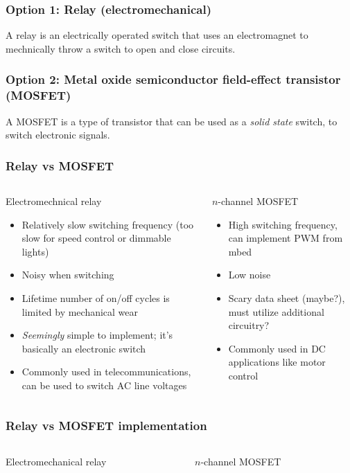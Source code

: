 \documentclass[aspectratio=169]{beamer}
\begin{document}
\begin{frame}
\frametitle{Option 1: Relay (electromechanical)}
A relay is an electrically operated switch that uses an electromagnet to mechnically throw a switch to open and close circuits. 
\end{frame}

\begin{frame}
\frametitle{Option 2: Metal oxide semiconductor field-effect transistor ({MOSFET})}
A MOSFET is a type of transistor that can be used as a \emph{solid state} switch, to switch electronic signals. 
\end{frame}

\begin{frame}
\frametitle{Relay vs {MOSFET}}
\begin{columns}
\begin{column}{0.5\textwidth}
Electromechnical relay
\begin{itemize}
\item Relatively slow switching frequency (too slow for speed control or dimmable lights)
\item Noisy when switching
\item Lifetime number of on/off cycles is limited by mechanical wear
\item \emph{Seemingly} simple to implement; it's basically an electronic switch
\item Commonly used in telecommunications, can be used to switch AC line voltages
\end{itemize}
\end{column}
\begin{column}{0.5\textwidth}
$n$-channel MOSFET
\begin{itemize}
\item High switching frequency, can implement PWM from mbed
\item Low noise
\item Scary data sheet (maybe?), must utilize additional circuitry?
\item Commonly used in DC applications like motor control
\end{itemize}
\end{column}
\end{columns}
\end{frame}

\begin{frame}
\frametitle{Relay vs {MOSFET} implementation}
\begin{columns}
\begin{column}{0.5\textwidth}
Electromechanical relay
\end{column}
\begin{column}{0.5\textwidth}
$n$-channel MOSFET
\end{column}
\end{columns}
\end{frame}
\end{document}
